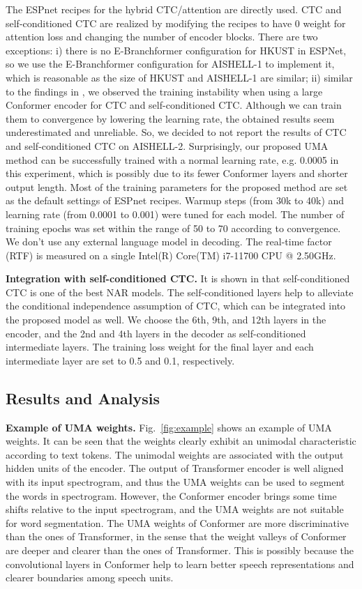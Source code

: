 \documentclass{article}
\begin{document}
The ESPnet recipes \cite{watanabe2018espnet} for the hybrid CTC/attention are directly used. CTC and self-conditioned CTC are realized by modifying the recipes to have 0 weight for attention loss and changing the number of encoder blocks. There are two exceptions: i) there is no E-Branchformer configuration for HKUST in ESPNet, so we use the E-Branchformer configuration for AISHELL-1 to implement it, which is reasonable as the size of HKUST and AISHELL-1 are similar; ii) similar to the findings in \cite{peng2023comparative}, we observed the training instability when using a large Conformer encoder for CTC and self-conditioned CTC. 
Although we can train them to convergence by lowering the learning rate, the obtained results seem underestimated and unreliable. So, we decided to not report the results of CTC and self-conditioned CTC on AISHELL-2. Surprisingly, our proposed UMA method can be successfully trained with a normal learning rate, e.g. 0.0005 in this experiment, which is possibly due to its fewer Conformer layers and shorter output length.
Most of the training parameters for the proposed method are set as the default settings of ESPnet recipes. Warmup steps (from 30k to 40k) and learning rate (from 0.0001 to 0.001) were tuned for each model. The number of training epochs was set within the range of 50 to 70 according to convergence. We don’t use any external language model in decoding. The real-time factor (RTF) is measured on a single Intel(R) Core(TM) i7-11700 CPU @ 2.50GHz. 

\textbf{Integration with self-conditioned CTC.}
It is shown in \cite{higuchi2021comparative} that self-conditioned CTC is one of the best NAR models. The self-conditioned layers help to alleviate the conditional independence assumption of CTC, which can be integrated into the proposed model as well.
We choose the 6th, 9th, and 12th layers in the encoder, and the 2nd and 4th layers in the decoder as self-conditioned intermediate layers. The training loss weight for the final layer and each intermediate layer are set to 0.5 and 0.1, respectively. 


\subsection{Results and Analysis} 

\textbf{Example of UMA weights.} Fig.~\ref{fig:example} shows an example of UMA weights. It can be seen that the weights clearly exhibit an unimodal characteristic according to text tokens. The unimodal weights are associated with the output hidden units of the encoder. The output of Transformer encoder is well aligned with its input spectrogram, and thus the UMA weights can be used to segment the words in spectrogram. However, the Conformer encoder brings some time shifts relative to the input spectrogram, and the UMA weights are not suitable for word segmentation. The UMA weights of Conformer are more discriminative than the ones of Transformer, in the sense that the weight valleys of Conformer are deeper and clearer than the ones of Transformer. This is possibly because the convolutional layers in Conformer help to learn better speech representations and clearer boundaries among speech units. 
\end{document}
